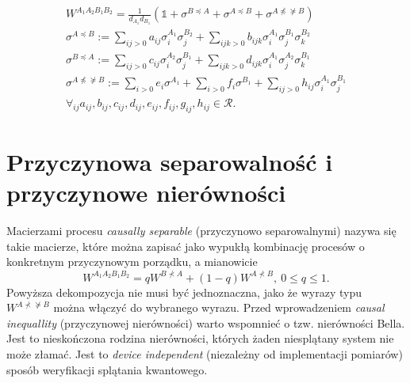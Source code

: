 \documentclass[10pt]{article} %
\newcommand{\WAll}{W^{A_1A_2B_1B_2}}
\begin{document}
\begin{gather}
\WAll = \frac{1}{d_{A_1}d_{B_1}}(\mathbb{1} +\sigma^{B \preceq A} + \sigma^{A \preceq B} + \sigma^{A \npreceq \nsucceq B}) \\
\sigma^{A \preceq B} := \sum_{ij>0} a_{ij} \sigma^{A_1}_i \sigma^{B_2}_j + \sum_{ijk>0} b_{ijk} \sigma^{A_1}_i \sigma^{B_1}_j \sigma^{B_2}_k \\
\sigma^{B \preceq A} := \sum_{ij>0} c_{ij} \sigma^{A_2}_i \sigma^{B_1}_j + \sum_{ijk>0} d_{ijk} \sigma^{A_1}_i \sigma^{A_2}_j \sigma^{B_1}_k \\
 \sigma^{A \npreceq \nsucceq B} := \sum_{i>0} e_i  \sigma^{A_1} + \sum_{i>0} f_i  \sigma^{B_1} + \sum_{ij>0} h_{ij} \sigma^{A_1}_i \sigma^{B_1}_j \\
 \forall_{ij} a_{ij}, b_{ij}, c_{ij}, d_{ij}, e_{ij}, f_{ij}, g_{ij}, h_{ij} \in \mathcal{R} \nonumber.
\end{gather}
\section{Przyczynowa separowalność i przyczynowe nierówności}
Macierzami procesu \textit{causally separable} (przyczynowo separowalnymi) nazywa się takie macierze, które można zapisać jako wypukłą kombinację procesów o konkretnym przyczynowym porządku, a mianowicie
\begin{equation}
\label{eq:sep}
\WAll = qW^{B \nprec A} + (1-q)W^{A \nprec B},~0 \leq q \leq 1.
\end{equation}
Powyższa dekompozycja nie musi być jednoznaczna, jako że wyrazy typu $W^{A \nprec \nsucceq B}$ można włączyć do wybranego wyrazu.
Przed wprowadzeniem \textit{causal inequallity} (przyczynowej nierówności) warto wspomnieć o tzw. nierówności Bella. Jest to nieskończona rodzina nierówności, których żaden niesplątany system nie może złamać. Jest to \textit{device independent} (niezależny od implementacji pomiarów) sposób weryfikacji splątania kwantowego.
\end{document}
